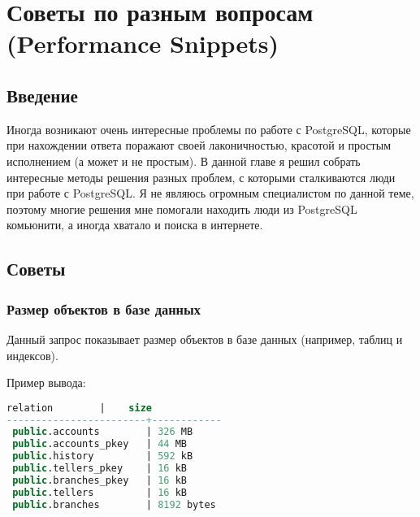 \chapter{Советы по разным вопросам (Performance Snippets)}

\begin{epigraphs}
\end{epigraphs}

\section{Введение}

Иногда возникают очень интересные проблемы по работе с PostgreSQL, которые при нахождении ответа поражают своей лаконичностью, красотой и простым исполнением (а может и не простым). В данной главе я решил собрать интересные методы решения разных проблем, с которыми сталкиваются люди при работе с PostgreSQL. Я не являюсь огромным специалистом по данной теме, поэтому многие решения мне помогали находить люди из PostgreSQL комьюнити, а иногда хватало и поиска в интернете.

\section{Советы}

\subsection{Размер объектов в базе данных}
Данный запрос показывает размер объектов в базе данных (например, таблиц и индексов).



Пример вывода:

\begin{lstlisting}[language=SQL,label=lst:snippets2,caption=Поиск самых больших объектов в БД. Пример вывода]
        relation        |    size
------------------------+------------
 public.accounts        | 326 MB
 public.accounts_pkey   | 44 MB
 public.history         | 592 kB
 public.tellers_pkey    | 16 kB
 public.branches_pkey   | 16 kB
 public.tellers         | 16 kB
 public.branches        | 8192 bytes
\end{lstlisting}

